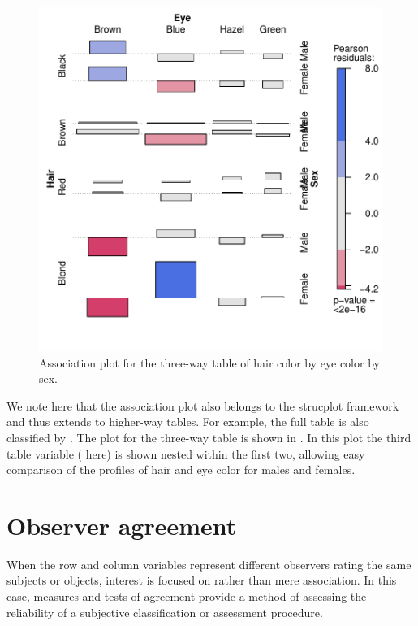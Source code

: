 \documentclass[11pt]{book}
\renewenvironment{knitrout}{\small\renewcommand{\baselinestretch}{.85}}{} %
\begin{document}
\begin{knitrout}
\color{fgcolor}\begin{kframe}
\begin{alltt}
 \hlstd{=}\hlstd{)}
\end{alltt}
\end{kframe}\begin{figure}[!htbp]


\centerline{\includegraphics[width=.6\textwidth]{ch04/fig/HE-assoc2} }

\caption[Association plot for the three-way table of hair color by eye color by sex]{Association plot for the three-way table of hair color by eye color by sex.\label{fig:HE-assoc2}}
\end{figure}


\end{knitrout}
We note here that the association plot also belongs to the
strucplot framework and thus extends to higher-way tables.
For example, the full  table is
also classified by .  
The plot for the three-way table
is shown in . 
In this plot the third table
variable ( here) is shown nested within the first two,
allowing easy comparison of the profiles of hair and eye color
for males and females.


\section{Observer agreement}\label{sec:twoway-agree}

When the row and column variables represent different
observers rating the same subjects or objects, interest is focused on
 rather than mere association.
In this case, measures and tests
of agreement provide a method of assessing the
reliability of a subjective classification or assessment procedure.
\end{document}
